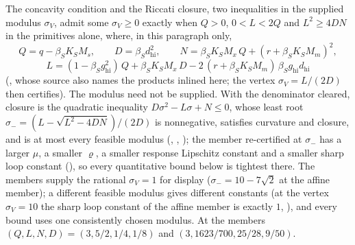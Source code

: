 The concavity condition and the Riccati closure, two inequalities in the
supplied modulus $\sigma_V$, admit some $\sigma_V\ge0$ exactly when $Q>0$,
$0<L<2Q$ and $L^2\ge4DN$ in the primitives alone, where, in this paragraph
only,
\[
Q=q-\beta_SK_SM_s,\qquad D=\beta_Sd_{\mathrm{hi}}^2,\qquad
N=\beta_SK_SM_x\,Q+(r+\beta_SK_SM_m)^2,
\]
\[
L=(1-\beta_Sg_{\mathrm{hi}}^2)\,Q+\beta_SK_SM_x\,D
-2\,(r+\beta_SK_SM_m)\,\beta_Sg_{\mathrm{hi}}d_{\mathrm{hi}}
\]
(, whose source also names the products inlined here;
the vertex $\sigma_V=L/(2D)$ then certifies). The modulus need not be
supplied. With the denominator cleared, closure is the quadratic inequality
$D\sigma^2-L\sigma+N\le0$, whose least root
$\sigma_-=(L-\sqrt{L^2-4DN})/(2D)$ is nonnegative, satisfies curvature and
closure, and is at most every feasible modulus (,
, ); the member re-certified at
$\sigma_-$ has a larger $\mu$, a smaller $\varrho$, a smaller response
Lipschitz constant and a smaller sharp loop constant
(), so every quantitative bound below is
tightest there. The members supply the rational $\sigma_V=1$ for display
($\sigma_-=10-7\sqrt2$ at the affine member); a different feasible modulus
gives different constants (at the vertex $\sigma_V=10$ the sharp loop
constant of the affine member is exactly $1$,
), and every bound uses one
consistently chosen modulus. At the members $(Q,L,N,D)=(3,5/2,1/4,1/8)$ and
$(3,1623/700,25/28,9/50)$.

